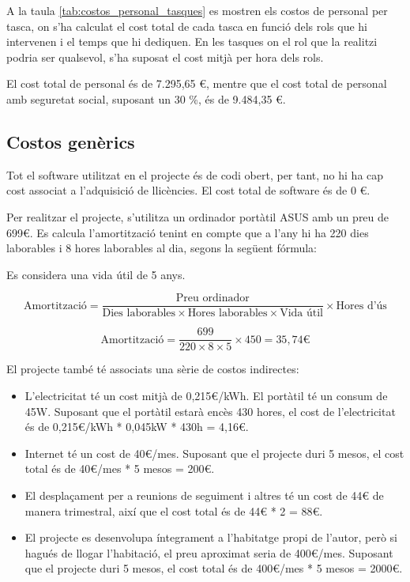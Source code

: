 \documentclass[a4paper,12pt]{report}
\begin{document}
A la taula \ref{tab:costos_personal_tasques} es mostren els costos de personal per tasca, on s'ha calculat el cost total de cada tasca en funció dels rols que hi intervenen i el temps que hi dediquen. En les tasques on el rol que la realitzi podria ser qualsevol, s'ha suposat el cost mitjà per hora dels rols.

El cost total de personal és de 7.295,65 €, mentre que el cost total de personal amb seguretat social, suposant un 30 \%, és de 9.484,35 €.

\subsection{Costos genèrics}

Tot el software utilitzat en el projecte és de codi obert, per tant, no hi ha cap cost associat a l'adquisició de llicències. El cost total de software és de 0 €.

Per realitzar el projecte, s'utilitza un ordinador portàtil ASUS amb un preu de 699€. Es calcula l'amortització tenint en compte que a l'any hi ha 220 dies laborables i 8 hores laborables al dia, segons la següent fórmula:

Es considera una vida útil de 5 anys.

\begin{equation}
    \text{Amortització} = \frac{\text{Preu ordinador}}{\text{Dies laborables} \times \text{Hores laborables} \times \text{Vida útil}} \times \text{Hores d'ús}
\end{equation}

\begin{equation}
    \text{Amortització} = \frac{699}{220 \times 8 \times 5} \times 450 = 35,74 \text{€}
\end{equation}

El projecte també té associats una sèrie de costos indirectes:

\begin{itemize}
    \item L'electricitat té un cost mitjà de 0,215€/kWh. El portàtil té un consum de 45W. Suposant que el portàtil estarà encès 430 hores, el cost de l'electricitat és de 0,215€/kWh * 0,045kW * 430h = 4,16€.
    \item Internet té un cost de 40€/mes. Suposant que el projecte duri 5 mesos, el cost total és de 40€/mes * 5 mesos = 200€.
    \item El desplaçament per a reunions de seguiment i altres té un cost de 44€ de manera trimestral, així que el cost total és de 44€ * 2 = 88€.
    \item El projecte es desenvolupa íntegrament a l'habitatge propi de l'autor, però si hagués de llogar l'habitació, el preu aproximat seria de 400€/mes. Suposant que el projecte duri 5 mesos, el cost total és de 400€/mes * 5 mesos = 2000€.
\end{itemize}
\end{document}
